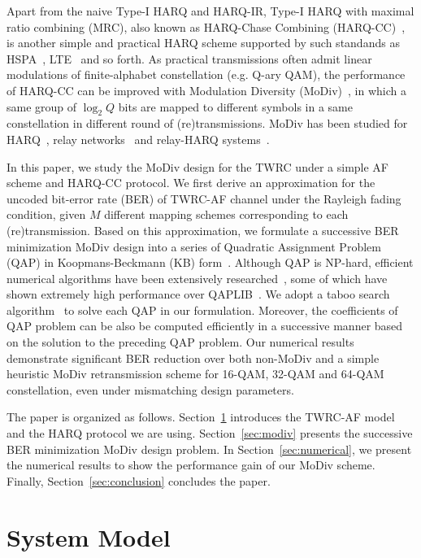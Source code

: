 \documentclass{article}
\begin{document}
Apart from the naive Type-I HARQ and HARQ-IR, Type-I HARQ with maximal ratio
combining (MRC), also known as HARQ-Chase Combining
(HARQ-CC)~\cite{chase1985code}, is another simple and practical HARQ
scheme supported by such standands as HSPA~\cite{TS25.308},
LTE~\cite{sesia2009lte} and so forth. As practical transmissions often admit
linear modulations of finite-alphabet constellation (e.g. Q-ary QAM), the
performance of HARQ-CC can be improved with Modulation Diversity
(MoDiv)~\cite{benelli1992new}, in which a same group of $\log_2Q$ bits are
mapped to different symbols in a same constellation in different round of
(re)transmissions. MoDiv has been studied for
HARQ~\cite{harvind2005symbol}, relay
networks~\cite{seddik2008trans, khormuji2008rate} and relay-HARQ
systems~\cite{kim2009design, ryu2011ber}.

In this paper, we study the MoDiv design for the TWRC under a simple AF scheme
and HARQ-CC protocol. We first derive an approximation for the uncoded bit-error
rate (BER) of TWRC-AF channel under the Rayleigh fading condition, given $M$
different mapping schemes corresponding to each (re)transmission. Based on this
approximation, we formulate a successive BER minimization MoDiv design into a
series of Quadratic Assignment Problem (QAP) in Koopmans-Beckmann (KB)
form~\cite{koopmans1957assignment}. Although QAP is NP-hard, efficient numerical
algorithms have been extensively researched~\cite{benlic2015memetic}, some of
which have shown extremely high performance over
QAPLIB~\cite{burkard1997qaplib}. We adopt a taboo search
algorithm~\cite{taillard1991robust} to solve each QAP in our formulation. Moreover, the coefficients of QAP problem can be also be computed efficiently in a
successive manner based on the solution to the preceding QAP problem. Our
numerical results demonstrate significant BER reduction over both non-MoDiv and
a simple heuristic MoDiv retransmission scheme for 16-QAM, 32-QAM and 64-QAM
constellation, even under mismatching design parameters.

The paper is organized as follows. Section~\ref{sec:model} introduces the
TWRC-AF model and the HARQ protocol we are using. Section~\ref{sec:modiv}
presents the successive BER minimization MoDiv design problem. In
Section~\ref{sec:numerical}, we present the numerical results to show the
performance gain of our MoDiv scheme. Finally, Section~\ref{sec:conclusion}
concludes the paper.

\section{System Model}
\label{sec:model}
\end{document}
